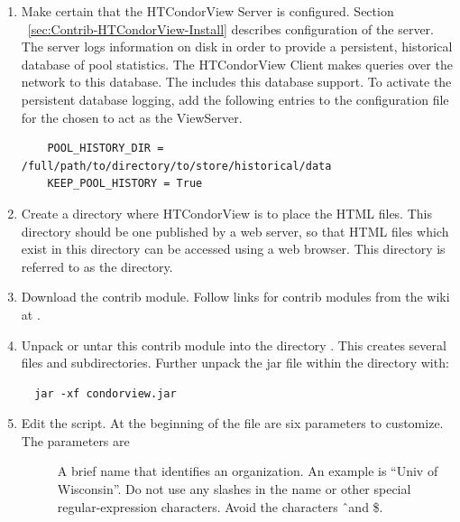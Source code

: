 \begin{enumerate}

\item Make certain that the HTCondorView Server is configured.
Section ~\ref{sec:Contrib-HTCondorView-Install}
describes configuration of the server.
The server logs information on disk in order to provide a persistent,
historical database of pool statistics.
The HTCondorView Client makes queries over the network to this
database.
The  includes this database support.
To activate the persistent database logging, add the following entries to
the configuration file for the  chosen to act as the ViewServer.
\begin{verbatim}
    POOL_HISTORY_DIR = /full/path/to/directory/to/store/historical/data 
    KEEP_POOL_HISTORY = True 
\end{verbatim}

\item Create a directory where HTCondorView is to place the HTML files.  
This directory should be one published by a web server, so that HTML
files which exist in this directory can be accessed using a web browser.  
This directory is referred to as the  directory.

\item Download the  contrib module.
Follow links for contrib modules from the wiki at
.

\item Unpack or untar this contrib module into the
directory .
This creates several files and subdirectories.
Further unpack the jar file within the  directory with:
\begin{verbatim} 
  jar -xf condorview.jar
\end{verbatim}

\item Edit the  script.  At the beginning of the file
are six parameters to customize.
The parameters are

        \begin{description}

	\item[] A brief name that identifies an
	organization. An example is ``Univ of Wisconsin''.  Do not
	use any slashes in the name or other special regular-expression
	characters. Avoid the characters \verb@\@ \^\ and \$.


\end{description}
\end{enumerate}
